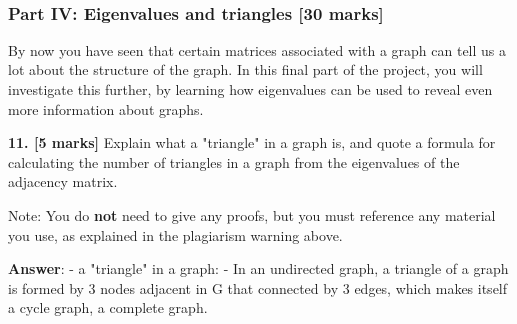 \documentclass[11pt]{article}
\begin{document}
    \begin{center}
    \end{center}
    { \hspace*{\fill} \\}
    
    \subsubsection{Part IV: Eigenvalues and triangles {[}30
marks{]}}\label{part-iv-eigenvalues-and-triangles-30-marks}

By now you have seen that certain matrices associated with a graph can
tell us a lot about the structure of the graph. In this final part of
the project, you will investigate this further, by learning how
eigenvalues can be used to reveal even more information about graphs.

\textbf{11. {[}5 marks{]}} Explain what a "triangle" in a graph is, and
quote a formula for calculating the number of triangles in a graph from
the eigenvalues of the adjacency matrix.

Note: You do \textbf{not} need to give any proofs, but you must
reference any material you use, as explained in the plagiarism warning
above.

    \textbf{Answer}: - a "triangle" in a graph: - In an undirected graph, a
triangle of a graph is formed by 3 nodes adjacent in G that connected by
3 edges, which makes itself a cycle graph, a complete graph.
\end{document}
